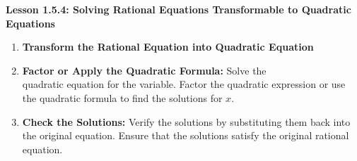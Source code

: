 \begin{center}
\textbf{Lesson 1.5.4: Solving Rational Equations Transformable to Quadratic Equations}
\end{center}

\vspace*{1ex}

\begin{enumerate}[label = \color{blue}\arabic*. ]
\item \textbf{Transform the
 Rational Equation into Quadratic Equation}
\item \textbf{Factor or Apply the Quadratic Formula:} Solve the \\quadratic equation for the variable. Factor the quadratic expression or use the quadratic formula to find the solutions for $ x $.
\item \textbf{Check the Solutions:} Verify the solutions by substituting them back into the original equation. Ensure that the solutions satisfy the original rational equation.
\end{enumerate}

 
